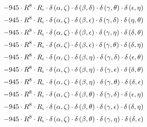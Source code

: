\begin{subequations}
\begin{gather}
 \\[0.2em] \notag 		 - 945 \cdot R^{8} \cdot R_{\iota{}} \cdot \delta{}\left(\alpha{}, \zeta{}\right) \cdot \delta{}\left(\beta{}, \delta{}\right) \cdot \delta{}\left(\gamma{}, \theta{}\right) \cdot \delta{}\left(\epsilon{}, \eta{}\right) 
 \\[0.2em] \notag 		 - 945 \cdot R^{8} \cdot R_{\iota{}} \cdot \delta{}\left(\alpha{}, \zeta{}\right) \cdot \delta{}\left(\beta{}, \epsilon{}\right) \cdot \delta{}\left(\gamma{}, \delta{}\right) \cdot \delta{}\left(\eta{}, \theta{}\right) 
 \\[0.2em] \notag 		 - 945 \cdot R^{8} \cdot R_{\iota{}} \cdot \delta{}\left(\alpha{}, \zeta{}\right) \cdot \delta{}\left(\beta{}, \epsilon{}\right) \cdot \delta{}\left(\gamma{}, \eta{}\right) \cdot \delta{}\left(\delta{}, \theta{}\right) 
 \\[0.2em] \notag 		 - 945 \cdot R^{8} \cdot R_{\iota{}} \cdot \delta{}\left(\alpha{}, \zeta{}\right) \cdot \delta{}\left(\beta{}, \epsilon{}\right) \cdot \delta{}\left(\gamma{}, \theta{}\right) \cdot \delta{}\left(\delta{}, \eta{}\right) 
 \\[0.2em] \notag 		 - 945 \cdot R^{8} \cdot R_{\iota{}} \cdot \delta{}\left(\alpha{}, \zeta{}\right) \cdot \delta{}\left(\beta{}, \eta{}\right) \cdot \delta{}\left(\gamma{}, \delta{}\right) \cdot \delta{}\left(\epsilon{}, \theta{}\right) 
 \\[0.2em] \notag 		 - 945 \cdot R^{8} \cdot R_{\iota{}} \cdot \delta{}\left(\alpha{}, \zeta{}\right) \cdot \delta{}\left(\beta{}, \eta{}\right) \cdot \delta{}\left(\gamma{}, \epsilon{}\right) \cdot \delta{}\left(\delta{}, \theta{}\right) 
 \\[0.2em] \notag 		 - 945 \cdot R^{8} \cdot R_{\iota{}} \cdot \delta{}\left(\alpha{}, \zeta{}\right) \cdot \delta{}\left(\beta{}, \eta{}\right) \cdot \delta{}\left(\gamma{}, \theta{}\right) \cdot \delta{}\left(\delta{}, \epsilon{}\right) 
 \\[0.2em] \notag 		 - 945 \cdot R^{8} \cdot R_{\iota{}} \cdot \delta{}\left(\alpha{}, \zeta{}\right) \cdot \delta{}\left(\beta{}, \theta{}\right) \cdot \delta{}\left(\gamma{}, \delta{}\right) \cdot \delta{}\left(\epsilon{}, \eta{}\right) 
 \\[0.2em] \notag 		 - 945 \cdot R^{8} \cdot R_{\iota{}} \cdot \delta{}\left(\alpha{}, \zeta{}\right) \cdot \delta{}\left(\beta{}, \theta{}\right) \cdot \delta{}\left(\gamma{}, \epsilon{}\right) \cdot \delta{}\left(\delta{}, \eta{}\right) 
 \\[0.2em] \notag 		 - 945 \cdot R^{8} \cdot R_{\iota{}} \cdot \delta{}\left(\alpha{}, \zeta{}\right) \cdot \delta{}\left(\beta{}, \theta{}\right) \cdot \delta{}\left(\gamma{}, \eta{}\right) \cdot \delta{}\left(\delta{}, \epsilon{}\right) 

\end{gather}
\end{subequations}
